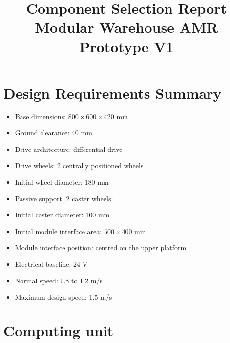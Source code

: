 \documentclass[12pt,a4paper]{article}
\title{
\textbf{Component Selection Report}\\
Modular Warehouse AMR Prototype V1}
\begin{document}
\maketitle

\section{Design Requirements Summary}

\begin{itemize}
\item Base dimensions: $800 \times 600 \times 420$ mm 
\item Ground clearance: 40 mm 
\item Drive architecture: differential drive 
\item Drive wheels: 2 centrally positioned wheels 
\item Initial wheel diameter: 180 mm 
\item Passive support: 2 caster wheels 
\item Initial caster diameter: 100 mm 
\item Initial module interface area: $500 \times 400$ mm 
\item Module interface position: centred on the upper platform 
\item Electrical baseline: 24 V 
\item Normal speed: 0.8 to 1.2 m/s 
\item Maximum design speed: 1.5 m/s
\end{itemize}

\newpage
\section{Computing unit}
\end{document}
